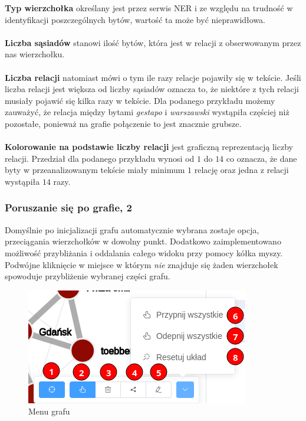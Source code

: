 \documentclass[12pt, a4paper]{article}
\begin{document}
\noindent\textbf{Typ wierzchołka} określany jest przez serwis NER i ze względu na trudność w identyfikacji poszczególnych bytów, wartość ta może być nieprawidłowa.\\\\
\textbf{Liczba sąsiadów} stanowi ilość bytów, która jest w relacji z obserwowanym przez nas wierzchołku.\\\\
\textbf{Liczba relacji} natomiast mówi o tym ile razy relacje pojawiły się w tekście. Jeśli liczba relacji jest większa od liczby sąsiadów oznacza to, że niektóre z tych relacji musiały pojawić się kilka razy w tekście. Dla podanego przykładu możemy zauważyć, że relacja między bytami \textit{gestapo} i \textit{warszawski} wystąpiła częściej niż pozostałe, ponieważ na grafie połączenie to jest znacznie grubsze.\\\\
\textbf{Kolorowanie na podstawie liczby relacji} jest graficzną reprezentacją liczby relacji. Przedział dla podanego przykładu wynosi od $1$ do $14$ co oznacza, że dane byty w przeanalizowanym tekście miały minimum $1$ relację oraz jedna z relacji wystąpiła $14$ razy.

\subsubsection{Poruszanie się po grafie, 2}\label{graph-movement}

Domyślnie po inicjalizacji grafu automatycznie wybrana zostaje opcja, przeciągania wierzchołków w dowolny punkt. Dodatkowo zaimplementowano możliwość przybliżania i oddalania całego widoku przy pomocy kółka myszy. Podwójne kliknięcie w miejsce w którym \textit{nie} znajduje się żaden wierzchołek spowoduje przybliżenie wybranej części grafu.

\begin{figure}[H]
    \centering
    \includegraphics[width=\linewidth]{images/graph-menu.png}
    \caption{Menu grafu}
    \label{graph-menu}
\end{figure}
\end{document}
